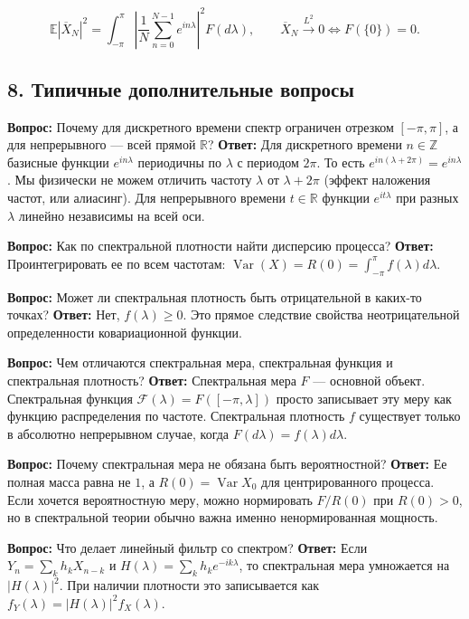 \documentclass[
  11pt,
  a4paper,
]{article}
\begin{document}
\[
\mathbb E|\overline X_N|^2
=
\int_{-\pi}^{\pi}
\left|
\frac1N\sum_{n=0}^{N-1}e^{in\lambda}
\right|^2F(d\lambda),
\qquad
\overline X_N\xrightarrow{L^2}0 \Longleftrightarrow F(\{0\})=0.
\]

\subsection{8. Типичные дополнительные
вопросы}\label{ux442ux438ux43fux438ux447ux43dux44bux435-ux434ux43eux43fux43eux43bux43dux438ux442ux435ux43bux44cux43dux44bux435-ux432ux43eux43fux440ux43eux441ux44b}

\textbf{Вопрос:} Почему для дискретного времени спектр ограничен
отрезком \([-\pi, \pi]\), а для непрерывного --- всей прямой
\(\mathbb{R}\)? \textbf{Ответ:} Для дискретного времени
\(n \in \mathbb{Z}\) базисные функции \(e^{i n \lambda}\) периодичны по
\(\lambda\) с периодом \(2\pi\). То есть
\(e^{i n (\lambda + 2\pi)} = e^{i n \lambda}\). Мы физически не можем
отличить частоту \(\lambda\) от \(\lambda + 2\pi\) (эффект наложения
частот, или алиасинг). Для непрерывного времени \(t \in \mathbb{R}\)
функции \(e^{i t \lambda}\) при разных \(\lambda\) линейно независимы на
всей оси.

\textbf{Вопрос:} Как по спектральной плотности найти дисперсию процесса?
\textbf{Ответ:} Проинтегрировать ее по всем частотам:
\(\operatorname{Var}(X) = R(0) = \int_{-\pi}^{\pi} f(\lambda) d\lambda\).

\textbf{Вопрос:} Может ли спектральная плотность быть отрицательной в
каких-то точках? \textbf{Ответ:} Нет, \(f(\lambda) \ge 0\). Это прямое
следствие свойства неотрицательной определенности ковариационной
функции.

\textbf{Вопрос:} Чем отличаются спектральная мера, спектральная функция
и спектральная плотность? \textbf{Ответ:} Спектральная мера \(F\) ---
основной объект. Спектральная функция
\(\mathcal F(\lambda)=F([-\pi,\lambda])\) просто записывает эту меру как
функцию распределения по частоте. Спектральная плотность \(f\)
существует только в абсолютно непрерывном случае, когда
\(F(d\lambda)=f(\lambda)d\lambda\).

\textbf{Вопрос:} Почему спектральная мера не обязана быть вероятностной?
\textbf{Ответ:} Ее полная масса равна не \(1\), а
\(R(0)=\operatorname{Var}X_0\) для центрированного процесса. Если
хочется вероятностную меру, можно нормировать \(F/R(0)\) при \(R(0)>0\),
но в спектральной теории обычно важна именно ненормированная мощность.

\textbf{Вопрос:} Что делает линейный фильтр со спектром? \textbf{Ответ:}
Если \(Y_n=\sum_k h_kX_{n-k}\) и \(H(\lambda)=\sum_kh_ke^{-ik\lambda}\),
то спектральная мера умножается на \(|H(\lambda)|^2\). При наличии
плотности это записывается как
\(f_Y(\lambda)=|H(\lambda)|^2f_X(\lambda)\).
\end{document}
